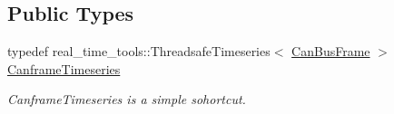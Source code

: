 \subsection*{Public Types}
\begin{DoxyCompactItemize}
\item 
typedef real\+\_\+time\+\_\+tools\+::\+Threadsafe\+Timeseries$<$ \hyperlink{classblmc__drivers_1_1CanBusFrame}{Can\+Bus\+Frame} $>$ \hyperlink{classblmc__drivers_1_1CanBusInterface_a2da2627c961927f48359ae7d7e1aa4da}{Canframe\+Timeseries}\hypertarget{classblmc__drivers_1_1CanBusInterface_a2da2627c961927f48359ae7d7e1aa4da}{}\label{classblmc__drivers_1_1CanBusInterface_a2da2627c961927f48359ae7d7e1aa4da}

\begin{DoxyCompactList}\small\item\em Canframe\+Timeseries is a simple sohortcut. \end{DoxyCompactList}\end{DoxyCompactItemize}
